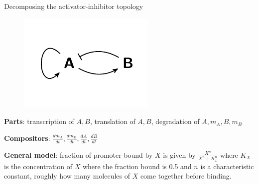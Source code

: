 \documentclass[handout]{beamer} %
\newcommand{\br}{\vspace{\baselineskip}}
\begin{document}
\begin{frame}{Decomposing the activator-inhibitor topology}
\begin{figure}
    \includegraphics[scale=1]{hasty_diagram.pdf}
\end{figure}

\textbf{Parts}: \pause transcription of $A, B$, translation of $A, B$, degradation of $A, m_A, B, m_B$

\br

\textbf{Compositors}: \pause $\frac{dm_A}{dt}, \frac{dm_B}{dt}, \frac{dA}{dt}, \frac{dB}{dt}$ \pause

\br

\textbf{General model}: fraction of promoter bound by $X$ is given by $\frac{X^n}{X^n + K_x^n}$ where $K_X$ is the concentration of $X$ where the fraction bound is 0.5 and $n$ is a characteristic constant, roughly how many molecules of $X$ come together before binding.


\end{frame}
\end{document}
